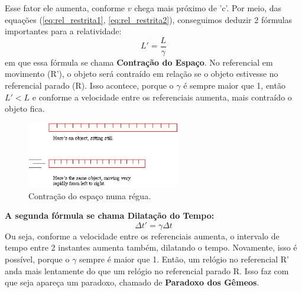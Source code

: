 \documentclass[12pt]{extarticle}
\newcommand{\<}{\langle}
\renewcommand{\>}{\rangle}
\theoremstyle{definition}
\begin{document}
Esse fator ele aumenta, conforme $v$ chega mais próximo de 'c'. Por meio, das equações (\ref{eq:rel_restrita1}, \ref{eq:rel_restrita2}), conseguimos deduzir 2 fórmulas importantes para a relatividade:
\begin{equation}
    L' = \frac{L}{\gamma}
\end{equation}
\noindent em que essa fórmula se chama \textbf{Contração do Espaço}. No referencial em movimento (R'), o objeto será contraído em relação se o objeto estivesse no referencial parado (R). Isso acontece, porque o $\gamma$ é sempre maior que 1, então $L'< L$ e conforme a velocidade entre os referenciais aumenta, mais contraído o objeto fica.
\begin{figure}[H]
    \centering
    \includegraphics[width=0.6\textwidth]{ruler.png}
    \caption{Contração do espaço numa régua.}
    \label{fig:space_contraction}
\end{figure}

\textbf{A segunda fórmula se chama Dilatação do Tempo:}
\begin{equation}
    \Delta t' = \gamma \Delta t
\end{equation}
Ou seja, conforme a velocidade entre os referenciais aumenta, o intervalo de tempo entre 2 instantes aumenta também, dilatando o tempo. Novamente, isso é possível, porque o $\gamma$ sempre é maior que 1. Então, um relógio no referencial R' anda mais lentamente do que um relógio no referencial parado R. Isso faz com que seja apareça um paradoxo, chamado de \textbf{Paradoxo dos Gêmeos}.
\end{document}
